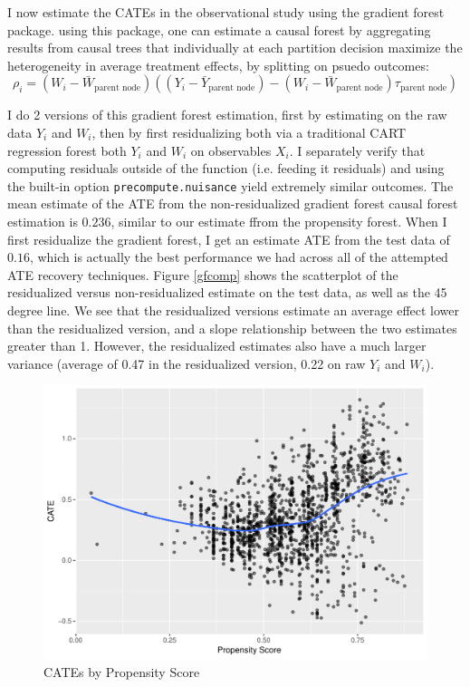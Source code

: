 \documentclass{article}
\begin{document}
I now estimate the CATEs in the observational study using the gradient forest package. using this package, one can estimate a causal forest by aggregating results from causal trees that individually at each partition decision maximize the heterogeneity in average treatment effects, by splitting on psuedo outcomes:
\[\rho_i =(W_i - \bar W_{\text{parent node}})( (Y_i - \bar Y_{\text{parent node}}) - (W_i - \bar W_{\text{parent node}})\tau_{\text{parent  node}}  ) \]

I do 2 versions of this gradient forest estimation, first by estimating on the raw data $Y_i$ and $W_i$, then by first residualizing both via a traditional CART regression forest both $Y_i$ and $W_i$ on observables $X_i$. I separately verify that computing residuals outside of the function (i.e. feeding it residuals) and using the built-in option \texttt{precompute.nuisance} yield extremely similar outcomes. The mean estimate of the ATE from the non-residualized gradient forest causal forest estimation is $0.236$, similar to our estimate ffrom the propensity forest. When I first residualize the gradient forest, I get an estimate ATE from the test data of $0.16$, which is actually the best performance we had across all of the attempted ATE recovery techniques. Figure \ref{gfcomp} shows the scatterplot of the residualized versus non-residualized estimate on the test data, as well as the 45 degree line. We see that the residualized versions estimate an average effect lower than the residualized version, and a slope relationship between the two estimates greater than 1. However, the residualized estimates also have a much larger variance (average of 0.47 in the residualized version, 0.22 on raw $Y_i$ and $W_i$).

\begin{figure}[!ht]
\center
\caption{CATEs by Propensity Score}
\label{pfcate}
\includegraphics[scale=.7]{PFCATEvPS.pdf}
\end{figure}
\end{document}
